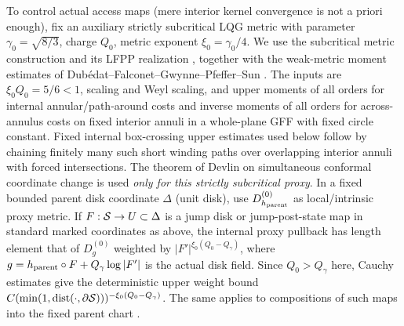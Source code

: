 To control actual access maps (mere interior kernel convergence is not a priori enough), fix an auxiliary strictly subcritical LQG metric with parameter \(\gamma_0=\sqrt{8/3}\), charge \(Q_0\), metric exponent \(\xi_0=\gamma_0/4\).
We use the subcritical metric construction and its LFPP realization \citep{GMMetric}, together with the weak-metric moment estimates of Dub\'edat--Falconet--Gwynne--Pfeffer--Sun \citep[Theorem~1.9 and Proposition~3.1]{DFGPS}.  The inputs are $\xi_0Q_0=5/6<1$, scaling and Weyl scaling, and upper moments of all orders for internal annular/path-around costs and inverse moments of all orders for across-annulus costs on fixed interior annuli in a whole-plane GFF with fixed circle constant.
Fixed internal box-crossing upper estimates used below follow by chaining finitely many such short winding paths over overlapping interior annuli with forced intersections.
The theorem of Devlin on simultaneous conformal coordinate change is used \emph{only for this strictly subcritical proxy}.
In a fixed bounded parent disk coordinate \(\Delta\) (unit disk), use \(D^{(0)}_{h_{\rm parent}}\) as local/intrinsic proxy metric.
If \(F:{\cal S}\to U\subset\Delta\) is a jump disk or jump-post-state map in standard marked coordinates as above, the internal proxy pullback has length element that of \(D^{(0)}_{g}\) weighted by \(|F'|^{\xi_0(Q_0-Q_\gamma)}\), where \(g=h_{\rm parent}\circ F+Q_\gamma\log|F'|\) is the actual disk field.
Since \(Q_0>Q_\gamma\) here, Cauchy estimates give the deterministic upper weight bound \(C(\min(1,\operatorname{dist}(\cdot,\partial{\cal S})))^{-\xi_0(Q_0-Q_\gamma)}\).
The same applies to compositions of such maps into the fixed parent chart \citep[Theorem~1.9 and Proposition~3.1]{DFGPS}\citep[Theorem~1.1]{Devlin}.

